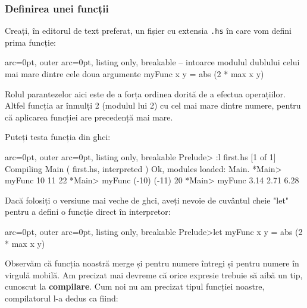 \subsubsection*{ Definirea unei funcții }

Creați, în editorul de text preferat, un fișier cu extensia \texttt{.hs} în care vom defini prima funcție:


\begin{tcblisting}{ arc=0pt, outer arc=0pt, listing only, breakable}
-- intoarce modulul dublului celui mai mare dintre cele doua argumente
myFunc x y = abs (2 * max x y)

\end{tcblisting}


\begin{tcolorbox}[colback=yellow!40, colframe=yellow!60, breakable]
Rolul parantezelor aici este de a forța ordinea dorită de a efectua operațiilor. Altfel funcția ar înmulți 2 (modulul lui 2) cu cel mai mare dintre numere, pentru că aplicarea funcției are precedență mai mare.
\end{tcolorbox}

Puteți testa funcția din ghci:

\begin{tcblisting}{ arc=0pt, outer arc=0pt, listing only, breakable}
Prelude> :l first.hs
[1 of 1] Compiling Main             ( first.hs, interpreted )
Ok, modules loaded: Main.
*Main> myFunc 10 11
22
*Main> myFunc (-10) (-11)
20
*Main> myFunc 3.14 2.71
6.28

\end{tcblisting}


\begin{tcolorbox}[colback=cyan!5, colframe=cyan!10, breakable]
Dacă folosiți o versiune mai veche de ghci, aveți nevoie de cuvântul cheie "let" pentru a defini o funcție direct în interpretor:

\begin{tcblisting}{ arc=0pt, outer arc=0pt, listing only, breakable}
Prelude>let myFunc x y = abs (2 * max x y)

\end{tcblisting}

\end{tcolorbox}

Observăm că funcția noastră merge și pentru numere întregi și pentru numere în virgulă mobilă. Am precizat mai devreme că orice expresie trebuie să aibă un tip, cunoscut la \textbf{compilare}. Cum noi nu am precizat tipul funcției noastre, compilatorul l-a dedus ca fiind:


